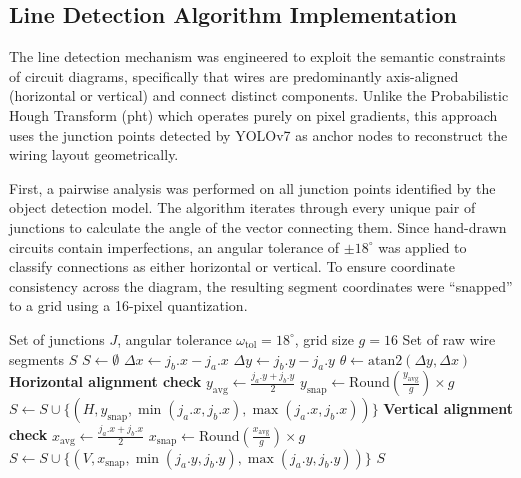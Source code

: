 \subsection{Line Detection Algorithm Implementation}

The line detection mechanism was engineered to exploit the semantic constraints of circuit diagrams, specifically that wires are predominantly axis-aligned (horizontal or vertical) and connect distinct components. Unlike the Probabilistic Hough Transform (\gls{pht}) which operates purely on pixel gradients, this approach uses the junction points detected by YOLOv7 as anchor nodes to reconstruct the wiring layout geometrically.

First, a pairwise analysis was performed on all junction points identified by the object detection model. The algorithm iterates through every unique pair of junctions to calculate the angle of the vector connecting them. Since hand-drawn circuits contain imperfections, an angular tolerance of $\pm 18^\circ$ was applied to classify connections as either horizontal or vertical. To ensure coordinate consistency across the diagram, the resulting segment coordinates were ``snapped'' to a grid using a 16-pixel quantization.

\begin{algorithm}
\caption{Wire Classification and Alignment}
\label{algo:wire-classification}
\begin{algorithmic}
\Require Set of junctions $J$, angular tolerance $\omega_{\text{tol}} = 18^\circ$, grid size $g = 16$
\Ensure Set of raw wire segments $S$
\State $S \leftarrow \emptyset$
    \State $\Delta x \leftarrow j_b.x - j_a.x$
    \State $\Delta y \leftarrow j_b.y - j_a.y$
    \State $\theta \leftarrow \text{atan2}(\Delta y, \Delta x)$
        \State \textbf{Horizontal alignment check}
        \State $y_{\text{avg}} \leftarrow \frac{j_a.y + j_b.y}{2}$
        \State $y_{\text{snap}} \leftarrow \text{Round}\left(\frac{y_{\text{avg}}}{g}\right) \times g$
        \State $S \leftarrow S \cup \{(H, y_{\text{snap}}, \min(j_a.x, j_b.x), \max(j_a.x, j_b.x))\}$
        \State \textbf{Vertical alignment check}
        \State $x_{\text{avg}} \leftarrow \frac{j_a.x + j_b.x}{2}$
        \State $x_{\text{snap}} \leftarrow \text{Round}\left(\frac{x_{\text{avg}}}{g}\right) \times g$
        \State $S \leftarrow S \cup \{(V, x_{\text{snap}}, \min(j_a.y, j_b.y), \max(j_a.y, j_b.y))\}$
    \EndIf
\EndFor
\State \Return $S$
\end{algorithmic}
\end{algorithm}

